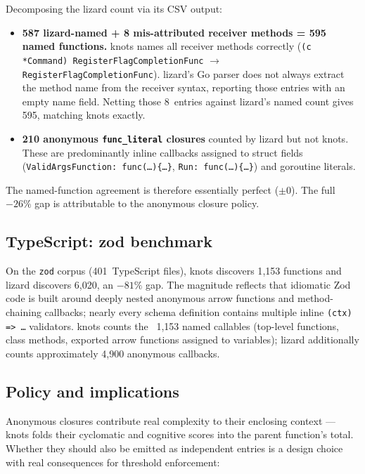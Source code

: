 \documentclass[10pt,twocolumn,letterpaper]{article}
\begin{document}
Decomposing the lizard count via its CSV output:

\begin{itemize}
  \item \textbf{587 lizard-named + 8 mis-attributed receiver methods = 595
    named functions.}  knots names all receiver methods correctly
    (\texttt{(c *Command) RegisterFlagCompletionFunc} $\to$
    \texttt{RegisterFlagCompletionFunc}).  lizard's Go parser does not always
    extract the method name from the receiver syntax, reporting those entries
    with an empty name field.  Netting those 8~entries against
    lizard's named count gives 595, matching knots exactly.
  \item \textbf{210 anonymous \texttt{func\_literal} closures} counted by
    lizard but not knots.  These are predominantly inline callbacks
    assigned to struct fields
    (\texttt{ValidArgsFunction: func(\ldots)\{\ldots\}},
     \texttt{Run: func(\ldots)\{\ldots\}}) and goroutine literals.
\end{itemize}

The named-function agreement is therefore essentially perfect ($\pm 0$).
The full $-26\%$ gap is attributable to the anonymous closure policy.

\subsection{TypeScript: zod benchmark}

On the \texttt{zod} corpus (401~TypeScript files), knots discovers 1{,}153
functions and lizard discovers 6{,}020, an $-81\%$ gap.  The magnitude
reflects that idiomatic Zod code is built around deeply nested anonymous
arrow functions and method-chaining callbacks; nearly every schema definition
contains multiple inline \texttt{(ctx) => \ldots} validators.  knots counts
the ~1{,}153 named callables (top-level functions, class methods, exported
arrow functions assigned to variables); lizard additionally counts
approximately 4{,}900 anonymous callbacks.

\subsection{Policy and implications}

Anonymous closures contribute real complexity to their enclosing context ---
knots folds their cyclomatic and cognitive scores into the parent function's
total.  Whether they should also be emitted as independent entries is a
design choice with real consequences for threshold enforcement:
\end{document}
